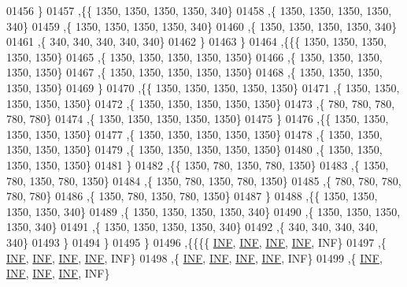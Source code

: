 \begin{DoxyCode}
01456    \}
01457   ,\{\{  1350,  1350,  1350,  1350,   340\}
01458    ,\{  1350,  1350,  1350,  1350,   340\}
01459    ,\{  1350,  1350,  1350,  1350,   340\}
01460    ,\{  1350,  1350,  1350,  1350,   340\}
01461    ,\{   340,   340,   340,   340,   340\}
01462    \}
01463   \}
01464  ,\{\{\{  1350,  1350,  1350,  1350,  1350\}
01465    ,\{  1350,  1350,  1350,  1350,  1350\}
01466    ,\{  1350,  1350,  1350,  1350,  1350\}
01467    ,\{  1350,  1350,  1350,  1350,  1350\}
01468    ,\{  1350,  1350,  1350,  1350,  1350\}
01469    \}
01470   ,\{\{  1350,  1350,  1350,  1350,  1350\}
01471    ,\{  1350,  1350,  1350,  1350,  1350\}
01472    ,\{  1350,  1350,  1350,  1350,  1350\}
01473    ,\{   780,   780,   780,   780,   780\}
01474    ,\{  1350,  1350,  1350,  1350,  1350\}
01475    \}
01476   ,\{\{  1350,  1350,  1350,  1350,  1350\}
01477    ,\{  1350,  1350,  1350,  1350,  1350\}
01478    ,\{  1350,  1350,  1350,  1350,  1350\}
01479    ,\{  1350,  1350,  1350,  1350,  1350\}
01480    ,\{  1350,  1350,  1350,  1350,  1350\}
01481    \}
01482   ,\{\{  1350,   780,  1350,   780,  1350\}
01483    ,\{  1350,   780,  1350,   780,  1350\}
01484    ,\{  1350,   780,  1350,   780,  1350\}
01485    ,\{   780,   780,   780,   780,   780\}
01486    ,\{  1350,   780,  1350,   780,  1350\}
01487    \}
01488   ,\{\{  1350,  1350,  1350,  1350,   340\}
01489    ,\{  1350,  1350,  1350,  1350,   340\}
01490    ,\{  1350,  1350,  1350,  1350,   340\}
01491    ,\{  1350,  1350,  1350,  1350,   340\}
01492    ,\{   340,   340,   340,   340,   340\}
01493    \}
01494   \}
01495  \}
01496 ,\{\{\{\{   \hyperlink{constants_8h_a12c2040f25d8e3a7b9e1c2024c618cb6}{INF},   \hyperlink{constants_8h_a12c2040f25d8e3a7b9e1c2024c618cb6}{INF},   \hyperlink{constants_8h_a12c2040f25d8e3a7b9e1c2024c618cb6}{INF},   \hyperlink{constants_8h_a12c2040f25d8e3a7b9e1c2024c618cb6}{INF},   INF\}
01497    ,\{   \hyperlink{constants_8h_a12c2040f25d8e3a7b9e1c2024c618cb6}{INF},   \hyperlink{constants_8h_a12c2040f25d8e3a7b9e1c2024c618cb6}{INF},   \hyperlink{constants_8h_a12c2040f25d8e3a7b9e1c2024c618cb6}{INF},   \hyperlink{constants_8h_a12c2040f25d8e3a7b9e1c2024c618cb6}{INF},   INF\}
01498    ,\{   \hyperlink{constants_8h_a12c2040f25d8e3a7b9e1c2024c618cb6}{INF},   \hyperlink{constants_8h_a12c2040f25d8e3a7b9e1c2024c618cb6}{INF},   \hyperlink{constants_8h_a12c2040f25d8e3a7b9e1c2024c618cb6}{INF},   \hyperlink{constants_8h_a12c2040f25d8e3a7b9e1c2024c618cb6}{INF},   INF\}
01499    ,\{   \hyperlink{constants_8h_a12c2040f25d8e3a7b9e1c2024c618cb6}{INF},   \hyperlink{constants_8h_a12c2040f25d8e3a7b9e1c2024c618cb6}{INF},   \hyperlink{constants_8h_a12c2040f25d8e3a7b9e1c2024c618cb6}{INF},   \hyperlink{constants_8h_a12c2040f25d8e3a7b9e1c2024c618cb6}{INF},   INF\}

\end{DoxyCode}
